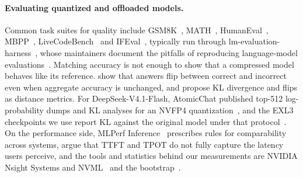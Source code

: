 \paragraph{Evaluating quantized and offloaded models.}
Common task suites for quality include GSM8K~\citep{cobbe2021gsm8k}, MATH~\citep{hendrycks2021math},
HumanEval~\citep{chen2021humaneval}, MBPP~\citep{austin2021mbpp}, LiveCodeBench~\citep{jain2025livecodebench} and
IFEval~\citep{zhou2023ifeval}, typically run through lm-evaluation-harness~\citep{sutawika2023lmeval}, whose
maintainers document the pitfalls of reproducing language-model evaluations~\citep{biderman2024lessons}. Matching
accuracy is not enough to show that a compressed model behaves like its reference. \citet{dutta2024accuracy} show that
answers flip between correct and incorrect even when aggregate accuracy is unchanged, and propose KL divergence and
flips as distance metrics. For DeepSeek-V4.1-Flash, AtomicChat published top-512 log-probability dumps and KL analyses
for an NVFP4 quantization~\citep{atomicchat2026dsv41metrics}, and the EXL3 checkpoints we use report KL against the
original model under that protocol~\citep{diffbot2026dsv41exl3,coolbho3k2026dsv41exl3}. On the performance side, MLPerf
Inference~\citep{reddi2020mlperf} prescribes rules for comparability across systems, \citet{agrawal2024etalon} argue
that TTFT and TPOT do not fully capture the latency users perceive, and the tools and statistics behind our
measurements are NVIDIA Nsight Systems and NVML~\citep{nvidia2026nsight,nvidia2026nvml} and the
bootstrap~\citep{efron1979bootstrap,efron1994bootstrap}.

